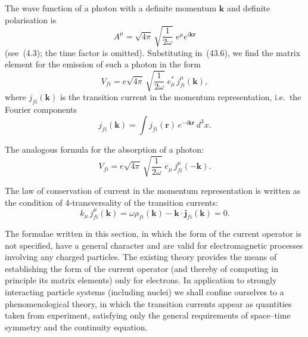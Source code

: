 The wave function of a photon with a definite momentum $\mathbf{k}$ and definite polarisation is
\begin{equation}
A^\mu = \sqrt{4\pi}\,\sqrt{\frac{1}{2\omega}}\;e^\mu e^{i\mathbf{k}\mathbf{r}}
\tag{43.9}
\end{equation}
(see~(4.3); the time factor is omitted). Substituting in~(43.6), we find the matrix element for the emission of such a photon in the form
\begin{equation}
V_{fi} = e\sqrt{4\pi}\,\sqrt{\frac{1}{2\omega}}\;e^*_\mu\,j^\mu_{fi}(\mathbf{k}),
\tag{43.10}
\end{equation}
where $j_{fi}(\mathbf{k})$ is the transition current in the momentum representation, i.e.\ the Fourier components
\begin{equation}
j_{fi}(\mathbf{k}) = \int j_{fi}(\mathbf{r})\,e^{-i\mathbf{k}\mathbf{r}}\,d^3x.
\tag{43.11}
\end{equation}

The analogous formula for the absorption of a photon:
\begin{equation}
V_{fi} = e\sqrt{4\pi}\,\sqrt{\frac{1}{2\omega}}\;e_\mu\,j^\mu_{fi}(-\mathbf{k}).
\tag{43.12}
\end{equation}

The law of conservation of current in the momentum representation is written as the condition of 4-transversality of the transition currents:
\begin{equation}
k_\mu\,j^\mu_{fi}(\mathbf{k}) = \omega\rho_{fi}(\mathbf{k}) - \mathbf{k}\cdot\mathbf{j}_{fi}(\mathbf{k}) = 0.
\tag{43.13}
\end{equation}

The formulae written in this section, in which the form of the current operator is not specified, have a general character and are valid for electromagnetic processes involving any charged particles. The existing theory provides the means of establishing the form of the current operator (and thereby of computing in principle its matrix elements) only for electrons. In application to strongly interacting particle systems (including nuclei) we shall confine ourselves to a phenomenological theory, in which the transition currents appear as quantities taken from experiment, satisfying only the general requirements of space--time symmetry and the continuity equation.
